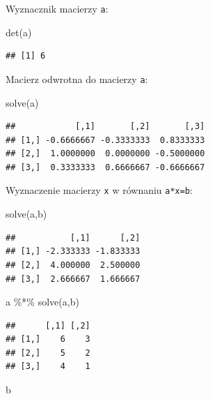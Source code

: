 \documentclass[
]{book}
\newenvironment{Shaded}{\begin{snugshade}}{\end{snugshade}}
\newcommand{\FunctionTok}[1]{\textcolor[rgb]{0.00,0.00,0.00}{#1}}
\newcommand{\NormalTok}[1]{#1}
\newcommand{\SpecialCharTok}[1]{\textcolor[rgb]{0.00,0.00,0.00}{#1}}
\begin{document}
Wyznacznik macierzy \texttt{a}:

\begin{Shaded}
\begin{Highlighting}[]
\FunctionTok{det}\NormalTok{(a)}
\end{Highlighting}
\end{Shaded}

\begin{verbatim}
## [1] 6
\end{verbatim}

Macierz odwrotna do macierzy \texttt{a}:

\begin{Shaded}
\begin{Highlighting}[]
\FunctionTok{solve}\NormalTok{(a)}
\end{Highlighting}
\end{Shaded}

\begin{verbatim}
##            [,1]       [,2]       [,3]
## [1,] -0.6666667 -0.3333333  0.8333333
## [2,]  1.0000000  0.0000000 -0.5000000
## [3,]  0.3333333  0.6666667 -0.6666667
\end{verbatim}

Wyznaczenie macierzy \texttt{x} w równaniu \texttt{a*x=b}:

\begin{Shaded}
\begin{Highlighting}[]
\FunctionTok{solve}\NormalTok{(a,b)}
\end{Highlighting}
\end{Shaded}

\begin{verbatim}
##           [,1]      [,2]
## [1,] -2.333333 -1.833333
## [2,]  4.000000  2.500000
## [3,]  2.666667  1.666667
\end{verbatim}

\begin{Shaded}
\begin{Highlighting}[]
\NormalTok{a }\SpecialCharTok{\%*\%} \FunctionTok{solve}\NormalTok{(a,b)}
\end{Highlighting}
\end{Shaded}

\begin{verbatim}
##      [,1] [,2]
## [1,]    6    3
## [2,]    5    2
## [3,]    4    1
\end{verbatim}

\begin{Shaded}
\begin{Highlighting}[]
\NormalTok{b}
\end{Highlighting}
\end{Shaded}
\end{document}
